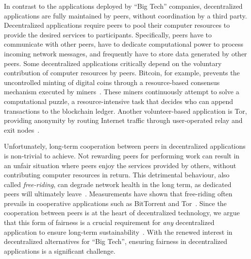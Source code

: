In contrast to the applications deployed by \enquote{Big Tech} companies, decentralized applications are fully maintained by peers, without coordination by a third party.
Decentralized applications require peers to pool their computer resources to provide the desired services to participants.
Specifically, peers have to communicate with other peers, have to dedicate computational power to process incoming network messages, and frequently have to store data generated by other peers.
Some decentralized applications critically depend on the voluntary contribution of computer resources by peers.
Bitcoin, for example, prevents the uncontrolled minting of digital coins through a resource-based consensus mechanism executed by miners~\cite{nakamoto2019bitcoin}.
These miners continuously attempt to solve a computational puzzle, a resource-intensive task that decides who can append transactions to the blockchain ledger.
Another volunteer-based application is Tor, providing anonymity by routing Internet traffic through user-operated relay and exit nodes~\cite{dingledine2004tor}.

Unfortunately, long-term cooperation between peers in decentralized applications is non-trivial to achieve.
Not rewarding peers for performing work can result in an unfair situation where peers enjoy the services provided by others, without contributing computer resources in return.
This detrimental behaviour, also called \emph{free-riding}, can degrade network health in the long term, as dedicated peers will ultimately leave~\cite{locher2006free}.
Measurements have shown that free-riding often prevails in cooperative applications such as BitTorrent and Tor~\cite{sirivianos2007free}.
Since the cooperation between peers is at the heart of decentralized technology, we argue that this form of fairness is a crucial requirement for \emph{any} decentralized application to ensure long-term sustainability~\cite{jelasity2004detection}.
With the renewed interest in decentralized alternatives for \enquote{Big Tech}, ensuring fairness in decentralized applications is a significant challenge.

